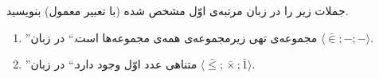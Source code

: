 جملات زیر را در زبان مرتبه‌ی اوّل مشخص شده (با تعبیر معمول) بنویسید.
  \begin{enumerate}
    \item ''مجموعه‌ی تهی زیرمجموعه‌ی همه‌ی مجموعه‌ها است.`` در زبان $\langle \bar{\in}; - ; -\rangle$.
    \item ''متناهی عدد اوّل وجود دارد.`` در زبان $\langle \bar{\leq} ; \bar{\times} ; \bar{1} \rangle$.
  \end{enumerate}